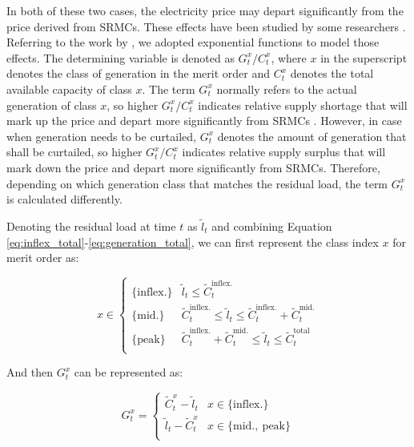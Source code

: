 In both of these two cases, the electricity price may depart significantly from the price derived from SRMCs. These effects have been studied by some researchers \cite{Eager2010,Grunewald2012,Grunewald2012a,He2013}. Referring to the work by \cite{Grunewald2012a}, we adopted exponential functions to model those effects. The determining variable is denoted as ${G^x_t}/{C^x_t}$, where $x$ in the superscript denotes the class of generation in the merit order and $C^x_t$ denotes the total available capacity of class $x$. The term $G^x_t$ normally refers to the actual generation of class $x$, so higher ${G^x_t}/{C^x_t}$ indicates relative supply shortage that will mark up the price and depart more significantly from SRMCs . However, in case when generation needs to be curtailed, $G^x_t$ denotes the amount of generation that shall be curtailed, so higher ${G^x_t}/{C^x_t}$ indicates relative supply surplus that will mark down the price and depart more significantly from SRMCs. Therefore, depending on which generation class that matches the residual load, the term $G^x_t$ is calculated differently. 

Denoting the residual load at time $t$ as $\tilde{l}_t$ and combining Equation \eqref{eq:inflex_total}-\eqref{eq:generation_total}, we can first represent the class index $x$ for merit order as:

\begin{equation}
\label{eq:merit-order-class}
x  \in \begin{cases}
\{\text{inflex.}\} & \tilde{l}_t \leq \tilde{C}_{t}^{\text{inflex.}}\\ 
\{\text{mid.}\} & \tilde{C}_{t}^{\text{inflex.}} \leq \tilde{l}_t \leq \tilde{C}_{t}^{\text{inflex.}} + \tilde{C}_{t}^{\text{mid.}} \\ 
\{\text{peak}\}&
\tilde{C}_{t}^{\text{inflex.}} + \tilde{C}_{t}^{\text{mid.}} \leq \tilde{l}_t  \leq \tilde{C}_{t}^{\text{total}}  \\ 
\end{cases}
\end{equation}

And then $G^x_t$ can be represented as: 

\begin{equation}
\label{eq:merit-order-generation}
G^x_t = 
\begin{cases}
\tilde{C}_{t}^{x} - \tilde{l}_t & x \in \{\text{inflex.}\} \\ 
\tilde{l}_t - \tilde{C}_{t}^{x} & x  \in \{\text{mid.},~\text{peak}\} \\ 
\end{cases}
\end{equation}

